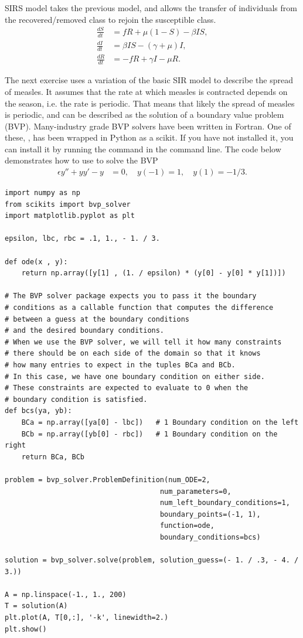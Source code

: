 SIRS model takes the previous model, and allows the transfer of individuals from the recovered/removed class to rejoin the susceptible class. 
\begin{align*}
\frac{dS}{dt} &= fR + \mu(1 -S) - \beta I S,\\
\frac{dI}{dt} &= \beta I S - (\gamma + \mu)I, \\
\frac{dR}{dt} &= -fR + \gamma I - \mu R.
\end{align*}

The next exercise uses a variation of the basic SIR model to describe the spread of measles. 
It assumes that the rate at which measles is contracted depends on the season, i.e. the rate is periodic. That means that likely the spread of measles is periodic, and can be described as the solution of a boundary value problem (BVP).
Many-industry grade BVP solvers have been written in Fortran. One of these, , has been wrapped in Python as a scikit. If you have not installed it, you can install it by running the command  in the command line. The code below demonstrates how to use  to solve the BVP
\begin{align*}
	\epsilon y'' + yy' - y &= 0, \quad y(-1) = 1, \quad y(1) = -1/3.
\end{align*}

\begin{lstlisting}
import numpy as np
from scikits import bvp_solver
import matplotlib.pyplot as plt

epsilon, lbc, rbc = .1, 1., - 1. / 3.

def ode(x , y):
    return np.array([y[1] , (1. / epsilon) * (y[0] - y[0] * y[1])]) 

# The BVP solver package expects you to pass it the boundary
# conditions as a callable function that computes the difference
# between a guess at the boundary conditions
# and the desired boundary conditions.
# When we use the BVP solver, we will tell it how many constraints
# there should be on each side of the domain so that it knows
# how many entries to expect in the tuples BCa and BCb.
# In this case, we have one boundary condition on either side.
# These constraints are expected to evaluate to 0 when the
# boundary condition is satisfied.
def bcs(ya, yb):
    BCa = np.array([ya[0] - lbc])   # 1 Boundary condition on the left
    BCb = np.array([yb[0] - rbc])   # 1 Boundary condition on the right
    return BCa, BCb

problem = bvp_solver.ProblemDefinition(num_ODE=2,
                                     num_parameters=0,
                                     num_left_boundary_conditions=1,
                                     boundary_points=(-1, 1),
                                     function=ode,
                                     boundary_conditions=bcs)

solution = bvp_solver.solve(problem, solution_guess=(- 1. / .3, - 4. / 3.))

A = np.linspace(-1., 1., 200)
T = solution(A)
plt.plot(A, T[0,:], '-k', linewidth=2.)
plt.show()
\end{lstlisting}

